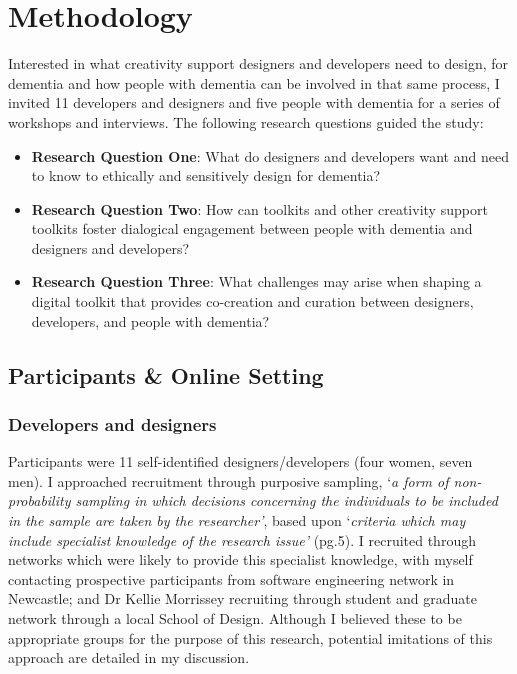 \section{Methodology}
\label{D3:Methodology}
Interested in what creativity support designers and developers need to design, for dementia and how people with dementia can be involved in that same process, I invited 11 developers and designers and five people with dementia for a series of workshops and interviews. The following research questions guided the study:
\begin{itemize}
    \item \textbf{Research Question One}: What do designers and developers want and need to know to ethically and sensitively design for dementia?
    \item \textbf{Research Question Two}: How can toolkits and other creativity support toolkits foster dialogical engagement between people with dementia and designers and developers?
    \item \textbf{Research Question Three}: What challenges may arise when shaping a digital toolkit that provides co-creation and curation between designers, developers, and people with dementia?
\end{itemize}

\subsection{Participants \& Online Setting}
\subsubsection{Developers and designers}
Participants were 11 self-identified designers/developers (four women, seven men). I approached recruitment through purposive sampling, ‘\textit{a form of non-probability sampling in which decisions concerning the individuals to be included in the sample are taken by the researcher’}, based upon ‘\textit{criteria which may include specialist knowledge of the research issue’ }(pg.5)\citep{rai2015study}. I recruited through networks which were likely to provide this specialist knowledge, with myself contacting prospective participants from software engineering network in Newcastle; and Dr Kellie Morrissey recruiting through student and graduate network through a local School of Design. Although I believed these to be appropriate groups for the purpose of this research, potential imitations of this approach are detailed in my discussion. 


